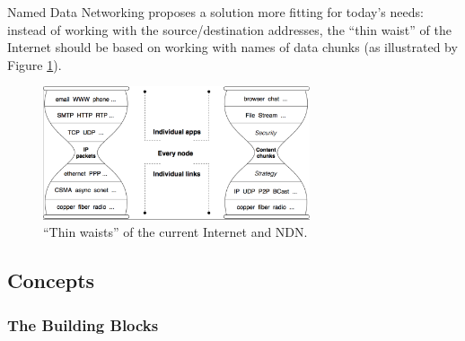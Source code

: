             Named Data Networking proposes a solution more fitting for today's needs: instead of working with the source/destination addresses, the ``thin waist'' of the Internet should be based on working with names of data chunks (as illustrated by Figure \ref{fig:ndn_waist}).

            \begin{figure}[H]
                \begin{center}
                    \includegraphics[width=0.7\textwidth]{fig/archs_ndn-hourglass.png}
                  \caption{``Thin waists'' of the current Internet and NDN.}
                  \label{fig:ndn_waist}
                \end{center}
            \end{figure}

        \subsection{Concepts}

            \subsubsection{The Building Blocks}

